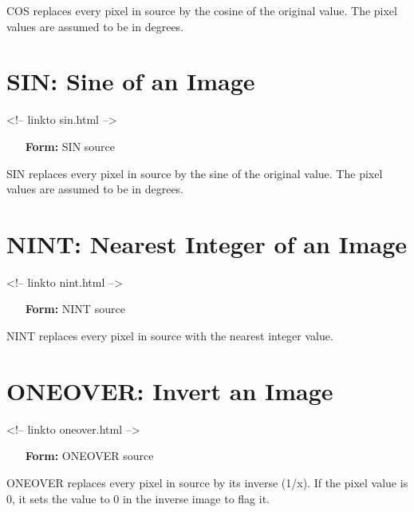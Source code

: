 COS replaces every pixel in source by the cosine of the original value. The
pixel values are assumed to be in degrees.

\section{SIN: Sine of an Image}
\begin{rawhtml}
<!-- linkto sin.html -->
\end{rawhtml}
\begin{itemize}
  \item[\textbf{Form:} SIN source\hfill]{}
\end{itemize}

SIN replaces every pixel in source by the sine of the original value. The
pixel values are assumed to be in degrees.

\section{NINT: Nearest Integer of an Image}
\begin{rawhtml}
<!-- linkto nint.html -->
\end{rawhtml}
\begin{itemize}
  \item[\textbf{Form:} NINT source\hfill]{}
\end{itemize}

NINT replaces every pixel in source with the nearest integer value.

\section{ONEOVER: Invert an Image}
\begin{rawhtml}
<!-- linkto oneover.html -->
\end{rawhtml}
\begin{itemize}
  \item[\textbf{Form:} ONEOVER source\hfill]{}
\end{itemize}

ONEOVER replaces every pixel in source by its inverse (1/x).  If the pixel
value is 0, it sets the value to 0 in the inverse image to flag it.

